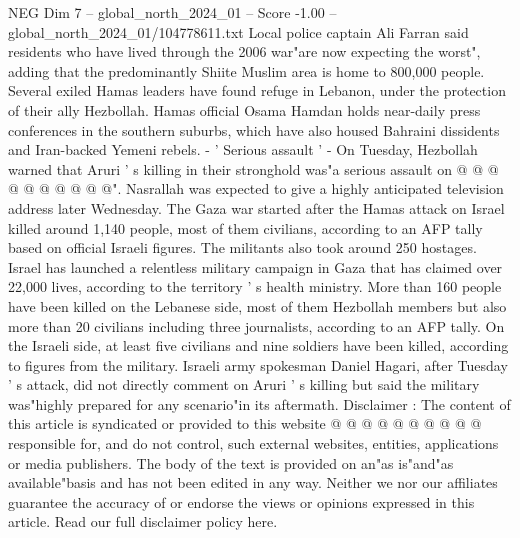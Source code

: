 \begin{textsample}{NEG Dim 7 – global\_north\_2024\_01 – Score -1.00 – global\_north\_2024\_01/104778611.txt}
Local police captain Ali Farran said residents who have lived through the 2006 war"are now expecting the worst", adding that the predominantly Shiite Muslim area is home to 800,000 people.
Several exiled Hamas leaders have found refuge in Lebanon, under the protection of their ally Hezbollah.
Hamas official Osama Hamdan holds near-daily press conferences in the southern suburbs, which have also housed Bahraini dissidents and Iran-backed Yemeni rebels. - ' Serious assault ' - On Tuesday, Hezbollah warned that Aruri ' s killing in their stronghold was"a serious assault on @ @ @ @ @ @ @ @ @ @".
Nasrallah was expected to give a highly anticipated television address later Wednesday.
The Gaza war started after the Hamas attack on Israel killed around 1,140 people, most of them civilians, according to an AFP tally based on official Israeli figures.
The militants also took around 250 hostages.
Israel has launched a relentless military campaign in Gaza that has claimed over 22,000 lives, according to the territory ' s health ministry.
More than 160 people have been killed on the Lebanese side, most of them Hezbollah members but also more than 20 civilians including three journalists, according to an AFP tally.
On the Israeli side, at least five civilians and nine soldiers have been killed, according to figures from the military.
Israeli army spokesman Daniel Hagari, after Tuesday ' s attack, did not directly comment on Aruri ' s killing but said the military was"highly prepared for any scenario"in its aftermath.
Disclaimer : The content of this article is syndicated or provided to this website @ @ @ @ @ @ @ @ @ @ responsible for, and do not control, such external websites, entities, applications or media publishers.
The body of the text is provided on an"as is"and"as available"basis and has not been edited in any way.
Neither we nor our affiliates guarantee the accuracy of or endorse the views or opinions expressed in this article.
Read our full disclaimer policy here.

\end{textsample}
